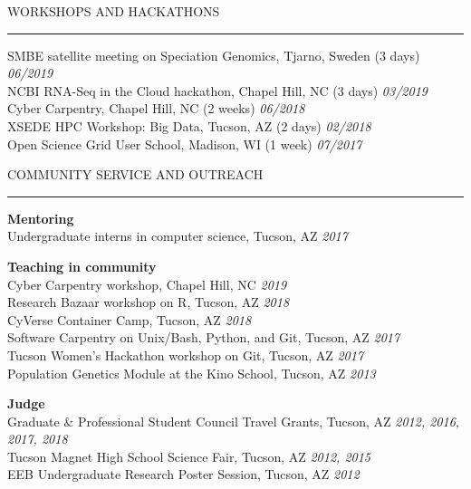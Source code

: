 \documentclass{resume} %
\renewenvironment{rSection}[1]{
\sectionskip
\textcolor{RoyalPurple}{\MakeUppercase{#1}}
\sectionlineskip
\hrule
\begin{list}{}{
\setlength{\leftmargin}{1.5em}
}
\item[]
}{
\end{list}
}
\begin{document}

\begin{rSection}{Workshops and Hackathons}

SMBE satellite meeting on Speciation Genomics, Tjarno, Sweden (3 days) \hfill{\em 06/2019}\\
NCBI RNA-Seq in the Cloud hackathon, Chapel Hill, NC (3 days) \hfill {\em 03/2019}\\
Cyber Carpentry, Chapel Hill, NC (2 weeks) \hfill {\em 06/2018}\\
XSEDE HPC Workshop: Big Data, Tucson, AZ (2 days) \hfill {\em 02/2018}\\
Open Science Grid User School, Madison, WI (1 week) \hfill {\em 07/2017}

\end{rSection}




\begin{rSection}{Community Service and Outreach}

\textbf{Mentoring}\\
Undergraduate interns in computer science, Tucson, AZ \hfill {\em 2017}

\textbf{Teaching in community}\\
Cyber Carpentry workshop, Chapel Hill, NC \hfill {\em 2019}\\
Research Bazaar workshop on R, Tucson, AZ \hfill {\em 2018}\\
CyVerse Container Camp, Tucson, AZ \hfill {\em 2018}\\
Software Carpentry on Unix/Bash, Python, and Git, Tucson, AZ \hfill {\em 2017}\\
Tucson Women’s Hackathon workshop on Git, Tucson, AZ \hfill {\em 2017}\\
Population Genetics Module at the Kino School, Tucson, AZ \hfill {\em 2013}

\textbf{Judge}\\
Graduate \& Professional Student Council Travel Grants, Tucson, AZ \hfill {\em 2012, 2016, 2017, 2018}\\
Tucson Magnet High School Science Fair, Tucson, AZ \hfill {\em 2012, 2015}\\
EEB Undergraduate Research Poster Session, Tucson, AZ \hfill {\em 2012}

\end{rSection}
\end{document}
